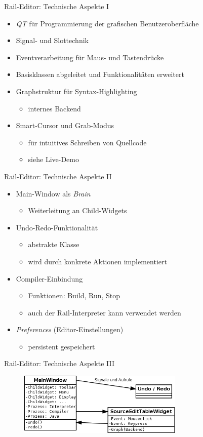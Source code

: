\begin{frame}{Rail-Editor: Technische Aspekte I}
	\begin{itemize}
		\item \textit{QT} für Programmierung der grafischen Benutzeroberfläche
		\item Signal- und Slottechnik
		\item Eventverarbeitung für Maus- und Tastendrücke
		\item Basisklassen abgeleitet und Funktionalitäten erweitert
		\item Graphstruktur für Syntax-Highlighting
		\begin{itemize}
			\item internes Backend
		\end{itemize}
		\item Smart-Cursor und Grab-Modus
		\begin{itemize}
			\item für intuitives Schreiben von Quellcode
			\item siehe Live-Demo
		\end{itemize}
	\end{itemize}
\end{frame}

\begin{frame}{Rail-Editor: Technische Aspekte II}
	\begin{itemize}
		\item Main-Window als \textit{Brain}
		\begin{itemize}
			\item Weiterleitung an Child-Widgets
		\end{itemize}
		\item Undo-Redo-Funktionalität
		\begin{itemize}
			\item abstrakte Klasse
			\item wird durch konkrete Aktionen implementiert
		\end{itemize}
		\item Compiler-Einbindung
		\begin{itemize}
			\item Funktionen: Build, Run, Stop
			\item auch der Rail-Interpreter kann verwendet werden
		\end{itemize}
		\item \textit{Preferences} (Editor-Einstellungen)
		\begin{itemize}
			\item persistent gespeichert
		\end{itemize}
	\end{itemize}

\end{frame}

\begin{frame}{Rail-Editor: Technische Aspekte III}
	\begin{figure}
		\centering
		\includegraphics[width=0.7\textwidth]{editor-uebersicht}
	\end{figure}
\end{frame}
